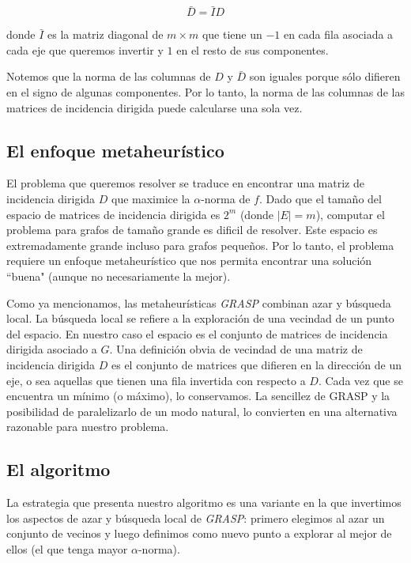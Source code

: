 \documentclass[conference,compsoc,a4paper]{IEEEtran}
\begin{document}
$$\bar{D} = \bar{I} D$$

\smallskip

donde $\bar{I}$ es la matriz diagonal de $m \times m$ que tiene un $-1$ 
en cada fila asociada a cada eje que queremos invertir y $1$ en el resto 
de sus componentes.

\smallskip

Notemos que la norma de las columnas de $D$ y $\bar{D}$ son iguales 
porque sólo difieren en el signo de algunas componentes. Por lo tanto, 
la norma de las columnas de las matrices de incidencia dirigida puede 
calcularse una sola vez.

\bigskip
\subsection{El enfoque metaheurístico}

El problema que queremos resolver se traduce en encontrar una matriz de 
incidencia dirigida $D$ que maximice la $\alpha$-norma de $f$. 
Dado que el tamaño del espacio de matrices de 
incidencia dirigida es $2^m$  (donde $|E|=m$), computar el problema
para grafos de tamaño grande es dificil de resolver. 
Este espacio es 
extremadamente grande incluso para grafos pequeños. Por lo tanto, el 
problema requiere un enfoque metaheurístico que nos permita encontrar 
una solución ``buena" (aunque no necesariamente la mejor).

\smallskip

Como ya mencionamos, las metaheurísticas \textit{GRASP} combinan azar y 
búsqueda local. La búsqueda local se refiere a la exploración de 
una vecindad de un punto del espacio. En nuestro caso el espacio es el 
conjunto de matrices de incidencia dirigida asociado a $G$. Una 
definición obvia de vecindad de una matriz de incidencia dirigida $D$ es 
el conjunto de matrices que difieren en la dirección de un eje, o sea 
aquellas que tienen una fila invertida con respecto a $D$. Cada vez que 
se encuentra un mínimo (o máximo), lo conservamos. La sencillez de 
GRASP y la posibilidad de paralelizarlo de un modo natural, lo 
convierten en una alternativa razonable para nuestro problema.

\subsection{El algoritmo}

La estrategia que presenta nuestro algoritmo es una variante en la que 
invertimos los aspectos de azar y búsqueda local de \textit{GRASP}: 
primero elegimos al azar un conjunto de vecinos y luego definimos como 
nuevo punto a explorar al mejor de ellos (el que tenga mayor 
$\alpha$-norma). 
\end{document}
